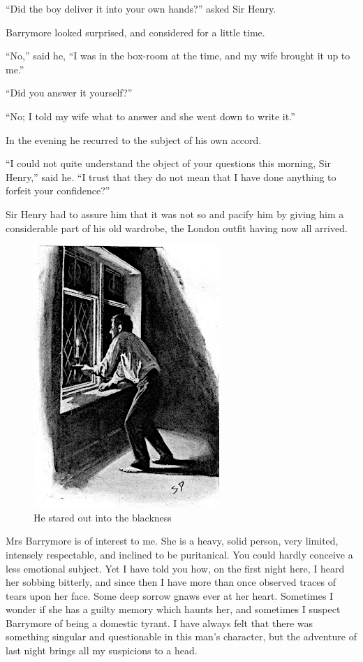 \documentclass[paper=5.5in:8.5in,BCOR=7mm,twoside,DIV=calc,12pt,usegeometry,openany,chapterprefix,endperiod,headings=big]{scrbook} %
\begin{document}
\enquote{Did the boy deliver it into your own hands?} asked Sir Henry.

Barrymore looked surprised, and considered for a little time.

\enquote{No,} said he, \enquote{I was in the box-room at the time, and my wife brought it up to me.}

\enquote{Did you answer it yourself?}

\enquote{No; I told my wife what to answer and she went down to write it.}

In the evening he recurred to the subject of his own accord.

\enquote{I could not quite understand the object of your questions this morning, Sir Henry,} said he. \enquote{I trust that they do not mean that I have done anything to forfeit your confidence?}

Sir Henry had to assure him that it was not so and pacify him by giving him a considerable part of his old wardrobe, the London outfit having now all arrived.
\begin{figure}
\centering
\includegraphics[width=.7\linewidth]{08_candle}
\caption{He stared out into the blackness}
\end{figure}

Mrs Barrymore is of interest to me. She is a heavy, solid person, very limited, intensely respectable, and inclined to be puritanical. You could hardly conceive a less emotional subject. Yet I have told you how, on the first night here, I heard her sobbing bitterly, and since then I have more than once observed traces of tears upon her face. Some deep sorrow gnaws ever at her heart. Sometimes I wonder if she has a guilty memory which haunts her, and sometimes I suspect Barrymore of being a domestic tyrant. I have always felt that there was something singular and questionable in this man's character, but the adventure of last night brings all my suspicions to a head.
\end{document}
